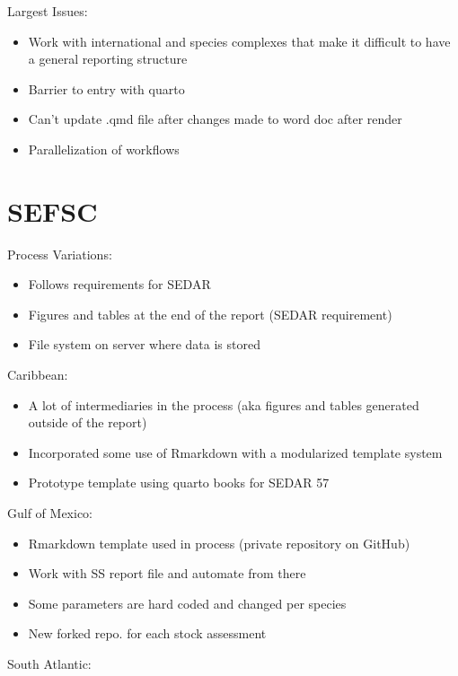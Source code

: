 \documentclass[
  letterpaper,
  oneside,
  open=any]{scrbook}
\begin{document}
Largest Issues:

\begin{itemize}
\item
  Work with international and species complexes that make it difficult
  to have a general reporting structure
\item
  Barrier to entry with quarto
\item
  Can't update .qmd file after changes made to word doc after render
\item
  Parallelization of workflows
\end{itemize}

\section{SEFSC}\label{sec-sefsc}

Process Variations:

\begin{itemize}
\item
  Follows requirements for SEDAR
\item
  Figures and tables at the end of the report (SEDAR requirement)
\item
  File system on server where data is stored
\end{itemize}

Caribbean:

\begin{itemize}
\item
  A lot of intermediaries in the process (aka figures and tables
  generated outside of the report)
\item
  Incorporated some use of Rmarkdown with a modularized template system
\item
  Prototype template using quarto books for SEDAR 57
\end{itemize}

Gulf of Mexico:

\begin{itemize}
\item
  Rmarkdown template used in process (private repository on GitHub)
\item
  Work with SS report file and automate from there
\item
  Some parameters are hard coded and changed per species
\item
  New forked repo. for each stock assessment
\end{itemize}

South Atlantic:
\end{document}
